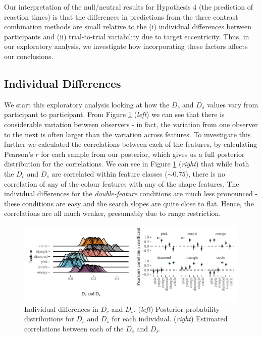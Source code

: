 \documentclass[preprint,12pt,authoryear]{elsarticle}
\begin{document}
Our interpretation of the null/neutral results for Hypothesis 4 (the prediction of reaction times) is that the differences in predictions from the three contrast combination methods are small relative to the (i) individual differences between participants and (ii) trial-to-trial variability due to target eccentricity. Thus, in our exploratory analysis, we investigate how incorporating these factors affects our conclusions.

\subsection{Individual Differences}

We start this exploratory analysis looking at how the $D_c$ and $D_s$ values vary from participant to participant. From Figure \ref{fig:exp_corr} (\textit{left}) we can see that there is considerable variation between observers - in fact, the variation from one observer to the next is often larger than the variation across features. To investigate this further we calculated the correlations between each of the features, by  calculating Pearson's $r$ for each sample from our posterior, which gives us a full posterior distribution for the correlations. We can see in Figure \ref{fig:exp_corr} (\textit{right}) that while both the $D_c$ and $D_s$ are correlated within feature classes ($\sim0.75$), there is no correlation of any of the colour features with any of the shape features. The individual differences for the \textit{double-feature} conditions are much less pronounced - these conditions are easy and the search slopes are quite close to flat. Hence, the correlations are all much weaker, presumably due to range restriction. 

\begin{figure}[ht]
\centering
\includegraphics[width=\textwidth]{../plots/single_feature_correlations.pdf}
\caption{Individual differences in $D_c$ and $D_s$. (\textit{left}) Posterior probability distributions for $D_c$ and $D_s$ for each individual. (\textit{right}) Estimated correlations between each of the $D_c$ and $D_s$.}
\label{fig:exp_corr}
\end{figure}
\end{document}
